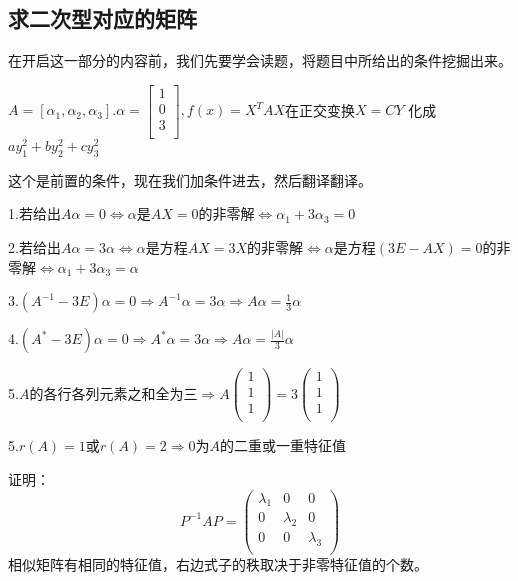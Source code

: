 \documentclass[lang=cn,10pt]{elegantbook}
\begin{document}
\subsection{求二次型对应的矩阵}
在开启这一部分的内容前，我们先要学会读题，将题目中所给出的条件挖掘出来。
\begin{example}
$	A=[\alpha_{1},\alpha_{2},\alpha_{3}].\alpha=\left[ \begin{array}{c}
		1\\
		0\\
		3\\
	\end{array} \right],f(x)=X^{T}AX$在正交变换$X=CY$ 化成$ay^{2}_{1}+by^{2}_{2}+cy^{2}_{3}$
\end{example}
这个是前置的条件，现在我们加条件进去，然后翻译翻译。
\begin{note}
	
	1.若给出$A\alpha=0\Longleftrightarrow $$\alpha$是$AX=0$的非零解$\Longleftrightarrow $$\alpha_{1}+3\alpha_{3}=0$
	
	2.若给出$A\alpha=3\alpha$$\Longleftrightarrow \alpha $是方程$AX=3X$的非零解$\Longleftrightarrow\alpha$是方程$(3E-AX)=0$的非零解$\Longleftrightarrow $$\alpha_{1}+3\alpha_{3}=\alpha$
	
	3.$(A^{-1}-3E)\alpha=0$$\Rightarrow $$A^{-1}\alpha=3\alpha$$\Rightarrow $$A\alpha=\frac{1}{3}\alpha$
	
	4.$(A^{*}-3E)\alpha=0$$\Rightarrow $$A^{*}\alpha=3\alpha$$\Rightarrow $$A\alpha=\frac{|A|}{3}\alpha$
	
	5.$A$的各行各列元素之和全为三$ \Rightarrow $$A\left( \begin{array}{c}
		1\\
		1\\
		1\\
	\end{array} \right) =3\left( \begin{array}{c}
		1\\
		1\\
		1\\
	\end{array} \right) $
	
	5.$r(A)=1$或$r(A)=2 \Rightarrow $0为$A$的二重或一重特征值
	
	证明：
	\begin{equation*}
		P^{-1}AP=\left( \begin{matrix}
			\lambda _1&		0&		0\\
			0&		\lambda _2&		0\\
			0&		0&		\lambda _3\\
		\end{matrix} \right) 
	\end{equation*}
	相似矩阵有相同的特征值，右边式子的秩取决于非零特征值的个数。
	

\end{note}
\end{document}

